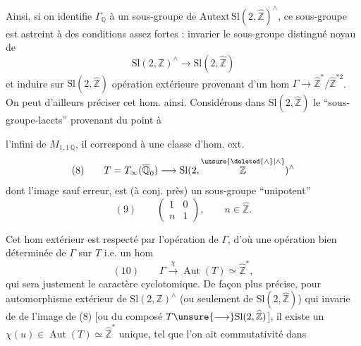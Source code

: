 
Ainsi, si on identifie $\Gamma_{\mathbb Q}$ 
à un sous-groupe de $\mathrm{Autext}\,\mathrm{Sl}(2,\widehat{\mathbb Z})^{\wedge}$,
ce sous-groupe \inserted{$\unsure{\Gamma}$} est astreint à des
conditions assez fortes :  invarier
le sous-groupe distingué noyau de
\[
\tag{7}
\mathrm{Sl}(2,\mathbb Z)^{\wedge}\longrightarrow
\mathrm{Sl}(2,\widehat{\mathbb Z})
\]
et induire sur $\mathrm{Sl}(2,\widehat{\mathbb Z})$
 opération extérieure
provenant d'un hom $\Gamma\longrightarrow
\widehat{\mathbb Z}^{*}/\widehat{\mathbb Z}^{*2}$.
On peut d'ailleurs préciser cet hom.
ainsi. Considérons dans $\mathrm{Sl}(2,\widehat{\mathbb Z})$ le
``sous-groupe-lacets'' provenant du point à


l'infini de $M_{1,1\,\mathbb Q}$, il correspond
à une classe d'hom. ext.
\[
(8)\qquad
T=T_{\infty}(\overline{\mathbb Q}_{0})
\longrightarrow
\mathrm{Sl}(2,\overset{\unsure{\deleted{\wedge}|\wedge}}{\mathbb Z})^{\wedge}
\]
dont l'image 
sauf erreur, est (à conj. près) un sous-groupe ``unipotent''
\[
(9)\qquad
\left(\begin{array}{cc}1&0\\ n&1\end{array}\right),
\qquad n\in\widehat{\mathbb Z}.
\]

Cet hom extérieur est respecté par l'opération de $\Gamma$, d'où une opération
bien déterminée de $\Gamma$ sur  $T$
i.e. un hom
\[
(10)\qquad
\Gamma\xrightarrow{\chi}\operatorname{Aut}(T)
\simeq\widehat{\mathbb Z}^{*},
\]
qui sera justement le caractère cyclotomique.
De façon plus précise, pour  automorphisme extérieur  de
$\mathrm{Sl}(2,\mathbb Z)^{\wedge}$ (ou seulement de $\mathrm{Sl}(2,\widehat{\mathbb Z})$)
qui invarie    de 
de l'image de (8) [ou  du composé
$T\unsure{\longrightarrow}\mathrm{Sl}(2,\widehat{\mathbb Z})$],
il existe un
$\chi(u)\in\operatorname{Aut}(T)\simeq\widehat{\mathbb Z}^{*}$ unique,
tel que l'on ait commutativité dans

